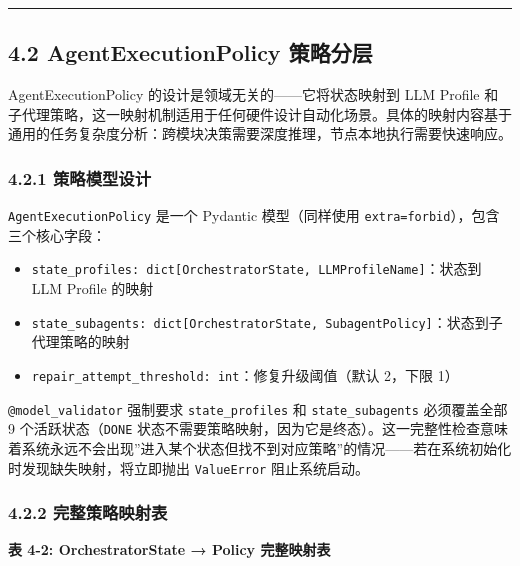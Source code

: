 \begin{center}\rule{0.5\linewidth}{0.5pt}\end{center}

\subsection{4.2 AgentExecutionPolicy
策略分层}\label{agentexecutionpolicy-ux7b56ux7565ux5206ux5c42}

AgentExecutionPolicy 的设计是领域无关的------它将状态映射到 LLM Profile
和子代理策略，这一映射机制适用于任何硬件设计自动化场景。具体的映射内容基于通用的任务复杂度分析：跨模块决策需要深度推理，节点本地执行需要快速响应。

\subsubsection{4.2.1
策略模型设计}\label{ux7b56ux7565ux6a21ux578bux8bbeux8ba1}

\texttt{AgentExecutionPolicy} 是一个 Pydantic 模型（同样使用
\texttt{extra=\textquotesingle{}forbid\textquotesingle{}}），包含三个核心字段：

\begin{itemize}
\tightlist
\item
  \texttt{state\_profiles:\ dict{[}OrchestratorState,\ LLMProfileName{]}}：状态到
  LLM Profile 的映射
\item
  \texttt{state\_subagents:\ dict{[}OrchestratorState,\ SubagentPolicy{]}}：状态到子代理策略的映射
\item
  \texttt{repair\_attempt\_threshold:\ int}：修复升级阈值（默认 2，下限
  1）
\end{itemize}

\texttt{@model\_validator} 强制要求 \texttt{state\_profiles} 和
\texttt{state\_subagents} 必须覆盖全部 9 个活跃状态（\texttt{DONE}
状态不需要策略映射，因为它是终态）。这一完整性检查意味着系统永远不会出现''进入某个状态但找不到对应策略''的情况------若在系统初始化时发现缺失映射，将立即抛出
\texttt{ValueError} 阻止系统启动。

\subsubsection{4.2.2
完整策略映射表}\label{ux5b8cux6574ux7b56ux7565ux6620ux5c04ux8868}

\textbf{表 4-2: OrchestratorState → Policy 完整映射表}

